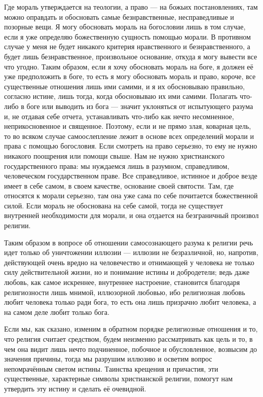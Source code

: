\documentclass[12pt,oneside]{book}
\begin{document}
Где мораль утверждается на теологии, а право --- на божьих постановлениях, там можно оправдать и обосновать самые безнравственные, несправедливые и позорные вещи. Я могу обосновать мораль на богословии лишь в том случае, если я уже определяю божественную сущность помощью морали. В противном случае у меня не будет никакого критерия нравственного и безнравственного, а будет лишь безнравственное, произвольное основание, откуда я могу вывести все что угодно. Таким образом, если я хочу обосновать мораль на боге, я должен её уже предположить в боге, то есть я могу обосновать мораль и право, короче, все существенные отношения лишь ими самими, и я их обосновываю правильно, согласно истине, лишь тогда, когда обосновываю их ими самими. Полагать что-либо в боге или выводить из бога --- значит уклоняться от испытующего разума и, не отдавая себе отчета, устанавливать что-либо как нечто несомненное, неприкосновенное и священное. Поэтому, если и не прямо злая, коварная цель, то во всяком случае самоослепление лежит в основе всех определений морали и права с помощью богословия. Если смотреть на право серьезно, то ему не нужно никакого поощрения или помощи свыше. Нам не нужно христианского государственного права: мы нуждаемся лишь в разумном, справедливом, человеческом государственном праве. Все справедливое, истинное и доброе везде имеет в себе самом, в своем качестве, основание своей святости. Там, где относятся к морали серьезно, там она уже сама по себе почитается божественной силой. Если мораль не обоснована на себе самой, тогда не существует внутренней необходимости для морали, и она отдается на безграничный произвол религии.

Таким образом в вопросе об отношении самосознающего разума к религии речь идет только об уничтожении иллюзии --- иллюзии не безразличной, но, напротив, действующей очень вредно на человечество и отнимающей у человека не только силу действительной жизни, но и понимание истины и добродетели; ведь даже любовь, как самое искреннее, внутреннее настроение, становится благодаря религиозности лишь мнимой, иллюзорной любовью, ибо религиозная любовь любит человека только ради бога, то есть она лишь призрачно любит человека, а на самом деле любит только бога.

Если мы, как сказано, изменим в обратном порядке религиозные отношения и то, что религия считает средством, будем неизменно рассматривать как цель и то, в чем она видит лишь нечто подчиненное, побочное и обусловленное, возвысим до значения причины, тогда мы разрушим иллюзию и осветим вопрос непомрачённым светом истины. Таинства крещения и причастия, эти существенные, характерные символы христианской религии, помогут нам утвердить эту истину и сделать её очевидной.
\end{document}
